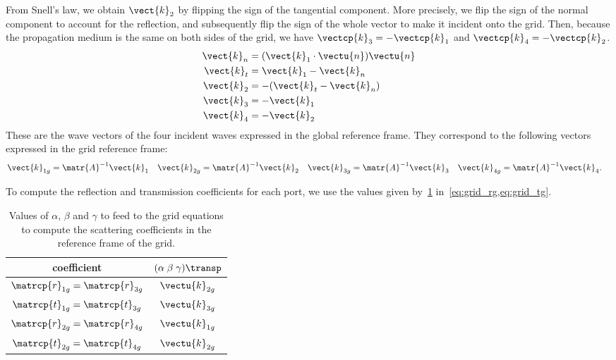 \begin{refsection}
From Snell's law, we obtain $\vect{k}_2$ by flipping the sign of the tangential component.
More precisely, we flip the sign of the normal component to account for the reflection, and subsequently flip the sign of the whole vector to make it incident onto the grid.
Then, because the propagation medium is the same on both sides of the grid, we have
$\vectcp{k}_3 = -\vectcp{k}_1$ and
$\vectcp{k}_4 = -\vectcp{k}_2$.
\begin{align}
    \vect{k}_n &= (\vect{k}_1 \cdot \vectu{n}) \vectu{n} \\
    \vect{k}_t &= \vect{k}_1 - \vect{k}_n                \\
    \vect{k}_2 &= -(\vect{k}_t - \vect{k}_n)             \\
    \vect{k}_3 &= -\vect{k}_1                            \\
    \vect{k}_4 &= -\vect{k}_2
\end{align}
These are the wave vectors of the four incident waves expressed in the global reference frame.
They correspond to the following vectors expressed in the grid reference frame:
\begin{align}
    \vect{k}_{1g} &= \matr{A}^{-1} \vect{k}_1 &
    \vect{k}_{2g} &= \matr{A}^{-1} \vect{k}_2 &
    \vect{k}_{3g} &= \matr{A}^{-1} \vect{k}_3 &
    \vect{k}_{4g} &= \matr{A}^{-1} \vect{k}_4
    \text{.}
\end{align}

To compute the reflection and transmission coefficients for each port, we use the values given by~\cref{tab:grid_values}
in~\cref{eq:grid_rg,eq:grid_tg}.
\begin{table}
    \centering
    \begin{tabular}{cc}
        \toprule
        coefficient                         & $(\alpha \; \beta \; \gamma)\transp$ \\
        \midrule
        $\matrcp{r}_{1g} = \matrcp{r}_{3g}$ & $\vectu{k}_{2g}$ \\
        $\matrcp{t}_{1g} = \matrcp{t}_{3g}$ & $\vectu{k}_{3g}$ \\
        $\matrcp{r}_{2g} = \matrcp{r}_{4g}$ & $\vectu{k}_{1g}$ \\
        $\matrcp{t}_{2g} = \matrcp{t}_{4g}$ & $\vectu{k}_{2g}$ \\
        \bottomrule
    \end{tabular}
    \caption{
        Values of $\alpha$, $\beta$ and $\gamma$
        to feed to the grid equations to compute the scattering coefficients in the reference frame of the grid.
    }
    \label{tab:grid_values}
\end{table}



\end{refsection}
